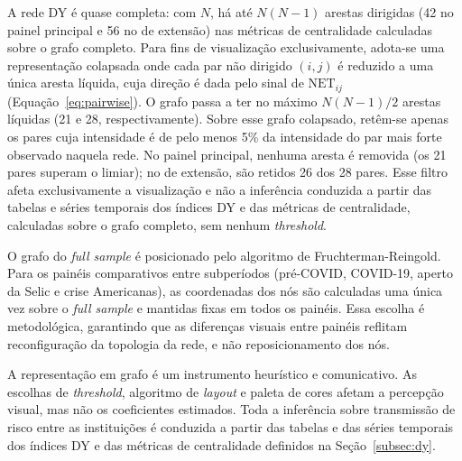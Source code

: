 \documentclass[12pt, a4paper, oneside, english, brazil]{abntex2}
\begin{document}
A rede DY é quase completa: com $N$, há até $N(N-1)$ arestas dirigidas (42 no painel principal e 56 no de extensão) 
nas métricas de centralidade calculadas sobre o grafo completo. 
Para fins de visualização exclusivamente, adota-se uma representação colapsada onde cada par
não dirigido $(i,j)$ é
reduzido a uma única aresta líquida, cuja direção é dada pelo sinal de
$\text{NET}_{ij}$ (Equação~\ref{eq:pairwise}). O grafo passa a ter
no máximo $N(N-1)/2$ arestas líquidas (21 e 28, respectivamente). Sobre esse grafo colapsado,
retêm-se apenas os pares cuja intensidade é de pelo menos 5\% da intensidade
do par mais forte observado naquela rede. No painel principal, nenhuma
aresta é removida (os 21 pares superam o limiar); no de extensão, são retidos 26 dos 28
pares. Esse filtro afeta
exclusivamente a visualização e não a inferência conduzida a partir das
tabelas e séries temporais dos índices DY e das métricas de centralidade,
calculadas sobre o grafo completo, sem nenhum \textit{threshold}.

O grafo do \textit{full sample} é posicionado pelo algoritmo de Fruchterman-Reingold. Para
os painéis comparativos entre subperíodos (pré-COVID, COVID-19, aperto da Selic e crise
Americanas), as coordenadas dos nós são calculadas uma única vez sobre o \textit{full
sample} e mantidas fixas em todos os painéis. Essa escolha é metodológica, garantindo que as
diferenças visuais entre painéis reflitam reconfiguração da topologia da rede, e não
reposicionamento dos nós.

A representação em grafo é um instrumento heurístico e comunicativo. As escolhas de
\textit{threshold}, algoritmo de \textit{layout} e paleta de cores afetam a percepção
visual, mas não os coeficientes estimados. Toda a inferência sobre transmissão de risco
entre as instituições é conduzida a partir das tabelas e das séries temporais dos índices
DY e das métricas de centralidade definidos na Seção~\ref{subsec:dy}.



\postextual

\printbibliography
\end{document}
